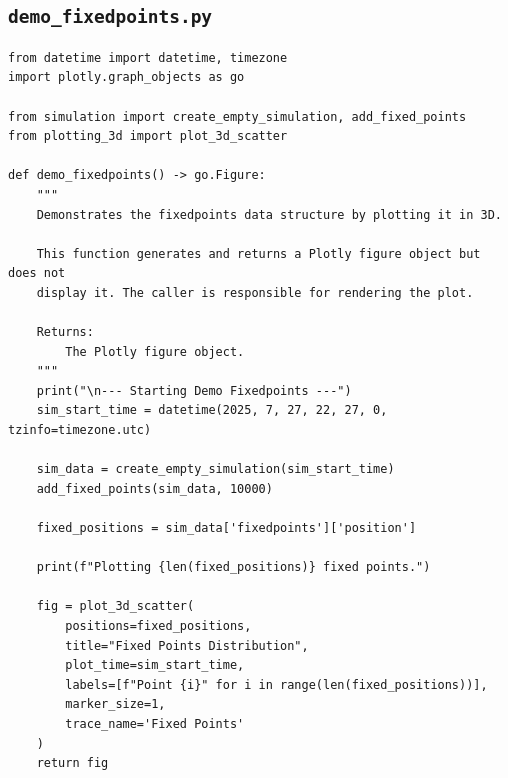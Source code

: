 \documentclass[11pt]{article}
\begin{document}
\subsection{\texttt{demo\_fixedpoints.py}}
\begin{Verbatim}
from datetime import datetime, timezone
import plotly.graph_objects as go

from simulation import create_empty_simulation, add_fixed_points
from plotting_3d import plot_3d_scatter

def demo_fixedpoints() -> go.Figure:
    """
    Demonstrates the fixedpoints data structure by plotting it in 3D.

    This function generates and returns a Plotly figure object but does not
    display it. The caller is responsible for rendering the plot.

    Returns:
        The Plotly figure object.
    """
    print("\n--- Starting Demo Fixedpoints ---")
    sim_start_time = datetime(2025, 7, 27, 22, 27, 0, tzinfo=timezone.utc)

    sim_data = create_empty_simulation(sim_start_time)
    add_fixed_points(sim_data, 10000)

    fixed_positions = sim_data['fixedpoints']['position']

    print(f"Plotting {len(fixed_positions)} fixed points.")

    fig = plot_3d_scatter(
        positions=fixed_positions,
        title="Fixed Points Distribution",
        plot_time=sim_start_time,
        labels=[f"Point {i}" for i in range(len(fixed_positions))],
        marker_size=1,
        trace_name='Fixed Points'
    )
    return fig
\end{Verbatim}
\end{document}
